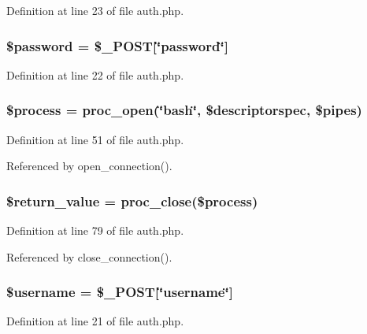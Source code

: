 Definition at line 23 of file auth.php.
\subsubsection{\setlength{\rightskip}{0pt plus 5cm}\$password = \$\_\-POST[\char`\"{}password\char`\"{}]}\label{auth_8php_a1}




Definition at line 22 of file auth.php.
\subsubsection{\setlength{\rightskip}{0pt plus 5cm}\$process = proc\_\-open(\char`\"{}bash\char`\"{}, \$descriptorspec, \$pipes)}\label{auth_8php_a3}




Definition at line 51 of file auth.php.

Referenced by open\_\-connection().
\subsubsection{\setlength{\rightskip}{0pt plus 5cm}\$return\_\-value = proc\_\-close(\$process)}\label{auth_8php_a4}




Definition at line 79 of file auth.php.

Referenced by close\_\-connection().
\subsubsection{\setlength{\rightskip}{0pt plus 5cm}\$username = \$\_\-POST[\char`\"{}username\char`\"{}]}\label{auth_8php_a0}




Definition at line 21 of file auth.php.